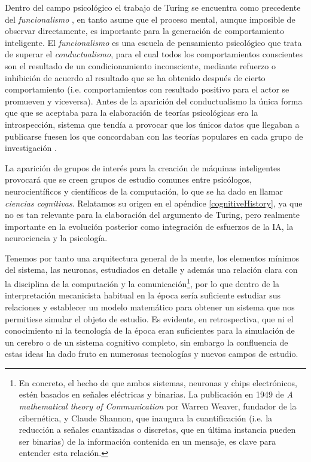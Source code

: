 \documentclass[12pt]{memoir}
\begin{document}
Dentro del campo psicológico el trabajo de Turing se encuentra como precedente del \textit{funcionalismo} \parencite{sep-functionalism}, en tanto asume que el proceso mental, aunque imposible de observar directamente, es importante para la generación de comportamiento inteligente. El \textit{funcionalismo} es una escuela de pensamiento psicológico que trata de superar el \textit{conductualismo}, para el cual todos los comportamientos conscientes son el resultado de un condicionamiento inconsciente, mediante refuerzo o inhibición de acuerdo al resultado que se ha obtenido después de cierto comportamiento (i.e. comportamientos con resultado positivo para el actor se promueven y viceversa). Antes de la aparición del conductualismo la única forma que que se aceptaba para la elaboración de teorías psicológicas era la introspección, sistema que tendía a provocar que los únicos datos que llegaban a publicarse fuesen los que concordaban con las teorías populares en cada grupo de investigación \parencite[p.13]{modernAI}.

La aparición de grupos de interés para la creación de máquinas inteligentes provocará que se creen grupos de estudio comunes entre psicólogos, neurocientíficos y científicos de la computación, lo que se ha dado en llamar \textit{ciencias cognitivas}. Relatamos su origen en el apéndice \ref{cognitiveHistory}, ya que no es tan relevante para la elaboración del argumento de Turing, pero realmente importante en la evolución posterior como integración de esfuerzos de la IA, la neurociencia y la psicología.

Tenemos por tanto una arquitectura general de la mente, los elementos mínimos del sistema, las neuronas, estudiados en detalle y además una relación clara con la disciplina de la computación y la comunicación\footnote{En concreto, el hecho de que ambos sistemas, neuronas y chips electrónicos, estén basados en señales eléctricas y binarias. La publicación en 1949 de \textit{A mathematical theory of Communication} por Warren Weaver, fundador de la cibernética, y Claude Shannon, que inaugura la cuantificación (i.e. la reducción a señales cuantizadas o discretas, que en última instancia pueden ser binarias) de la información contenida en un mensaje, es clave para entender esta relación.}, por lo que dentro de la interpretación mecanicista habitual en la época sería suficiente estudiar sus relaciones y establecer un modelo matemático para obtener un sistema que nos permitiese simular el objeto de estudio. Es evidente, en retrospectiva, que ni el conocimiento ni la tecnología de la época eran suficientes para la simulación de un cerebro o de un sistema cognitivo completo, sin embargo la confluencia de estas ideas ha dado fruto en numerosas tecnologías y nuevos campos de estudio.
\end{document}
